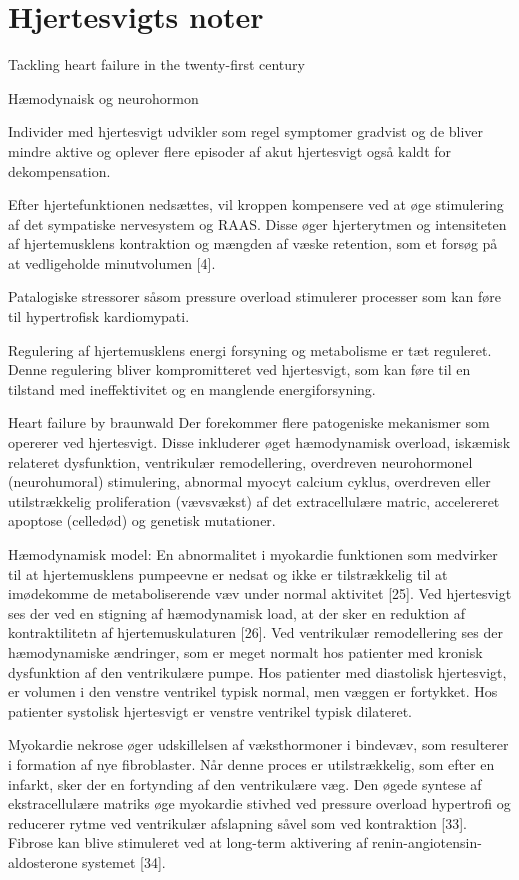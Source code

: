 \section{Hjertesvigts noter}

Tackling heart failure in the twenty-first century

Hæmodynaisk og neurohormon

Individer med hjertesvigt udvikler som regel symptomer gradvist og de bliver mindre aktive og oplever flere episoder af akut hjertesvigt også kaldt for dekompensation.


Efter hjertefunktionen nedsættes, vil kroppen kompensere ved at øge stimulering af det sympatiske nervesystem og RAAS. Disse øger hjerterytmen og intensiteten af hjertemusklens kontraktion og mængden af væske retention, som et forsøg på at vedligeholde minutvolumen [4]. 

Patalogiske stressorer såsom pressure overload stimulerer processer som kan føre til hypertrofisk kardiomypati.

Regulering af hjertemusklens energi forsyning og metabolisme er tæt reguleret. Denne regulering bliver kompromitteret ved hjertesvigt, som kan føre til en tilstand med ineffektivitet og en manglende energiforsyning.

Heart failure by braunwald 
Der forekommer flere patogeniske mekanismer som opererer ved hjertesvigt. Disse inkluderer øget hæmodynamisk overload, iskæmisk relateret dysfunktion, ventrikulær remodellering, overdreven neurohormonel (neurohumoral) stimulering, abnormal myocyt calcium cyklus, overdreven eller utilstrækkelig proliferation (vævsvækst) af det extracellulære matric, accelereret apoptose (celledød) og genetisk mutationer. 

Hæmodynamisk model: En abnormalitet i myokardie funktionen som medvirker til at hjertemusklens pumpeevne er nedsat og ikke er tilstrækkelig til at imødekomme de metaboliserende væv under normal aktivitet [25]. Ved hjertesvigt ses der ved en stigning af hæmodynamisk load, at der sker en reduktion af kontraktilitetn af hjertemuskulaturen [26]. Ved ventrikulær remodellering ses der hæmodynamiske ændringer, som er meget normalt hos patienter med kronisk dysfunktion af den ventrikulære pumpe. Hos patienter med diastolisk hjertesvigt, er volumen i den venstre ventrikel typisk normal, men væggen er fortykket. Hos patienter systolisk hjertesvigt er venstre ventrikel typisk dilateret.

Myokardie nekrose øger udskillelsen af væksthormoner i bindevæv, som resulterer i formation af nye fibroblaster. Når denne proces er utilstrækkelig, som efter en infarkt, sker der en fortynding af den ventrikulære væg. Den øgede syntese af ekstracellulære matriks øge myokardie stivhed ved pressure overload hypertrofi og reducerer rytme ved ventrikulær afslapning såvel som ved kontraktion [33]. Fibrose kan blive stimuleret ved at long-term aktivering af renin-angiotensin-aldosterone systemet [34]. 

